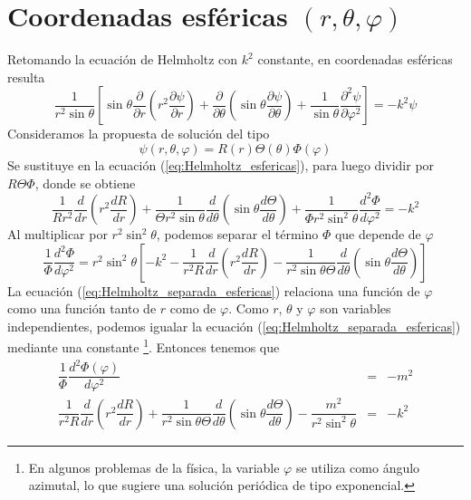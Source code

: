 \section{Coordenadas esféricas $(r, \theta, \varphi)$}
Retomando la ecuación de Helmholtz con $k^{2}$ constante, en coordenadas esféricas resulta
\begin{equation}
\dfrac{1}{r^{2} \sin \theta} \left[ \sin \theta \dfrac{\partial}{\partial r} \left( r^{2} \dfrac{\partial \psi}{\partial r} \right) + \dfrac{\partial}{\partial \theta} \left( \sin \theta \dfrac{\partial \psi}{\partial \theta} \right) + \dfrac{1}{\sin \theta} \dfrac{\partial^{2} \psi}{\partial \varphi^{2}} \right] = -k^{2} \psi \label{eq:Helmholtz_esfericas}
\end{equation}
Consideramos la propuesta de solución del tipo
\begin{equation}
\psi (r, \theta, \varphi) =  R(r) \Theta(\theta) \Phi(\varphi)
\end{equation}
Se sustituye en la ecuación (\ref{eq:Helmholtz_esfericas}), para luego dividir por $R \Theta \Phi$, donde se obtiene
\begin{equation}
\dfrac{1}{R r^{2}} \dfrac{d}{d r} \left( r^{2} \dfrac{d R}{d r} \right) + \dfrac{1}{\Theta r^{2} \sin \theta} \dfrac{d}{d \theta} \left( \sin \theta \dfrac{d \Theta}{d \theta} \right) + \dfrac{1}{\Phi r^{2} \sin^{2} \theta} \dfrac{d^{2} \Phi}{d \varphi^{2}} = - k^{2}
\end{equation}
Al multiplicar por $r^{2} \sin^{2} \theta$, podemos separar el término $\Phi$ que depende de $\varphi$
\begin{equation}
\dfrac{1}{\Phi} \dfrac{d^{2} \Phi}{d \varphi^{2}} =  r^{2} \sin^{2} \theta \left[ - k^{2} - \dfrac{1}{r^{2} R} \dfrac{d}{d r} \left( r^{2} \dfrac{d R}{d r} \right) - \dfrac{1}{r^{2} \sin \theta \Theta} \dfrac{d}{d \theta}\left( \sin \theta \dfrac{d \Theta}{d \theta} \right) \right] \label{eq:Helmholtz_separada_esfericas}
\end{equation}
La ecuación (\ref{eq:Helmholtz_separada_esfericas}) relaciona una función de $\varphi$ como una función tanto de $r$ como de $\varphi$. Como $r$, $\theta$ y $\varphi$ son variables independientes, podemos igualar la ecuación (\ref{eq:Helmholtz_separada_esfericas}) mediante una constante \footnote{En algunos problemas de la física, la variable $\varphi$ se utiliza como ángulo azimutal, lo que sugiere una solución periódica de tipo exponencial.}.
Entonces tenemos que
\begin{eqnarray}
\dfrac{1}{\Phi} \dfrac{d^{2} \Phi(\varphi)}{d \varphi^{2}} &=& - m^{2} \\
\dfrac{1}{r^{2} R} \dfrac{d}{d r} \left( r^{2} \dfrac{d R}{d r} \right) + \dfrac{1}{r^{2} \sin \theta \Theta} \dfrac{d}{d \theta} \left( \sin \theta \dfrac{d \Theta}{d \theta} \right) - \dfrac{m^{2}}{r^{2} \sin^{2} \theta} &=& - k^{2} \label{eq:Ecu_2_separada}
\end{eqnarray} 
